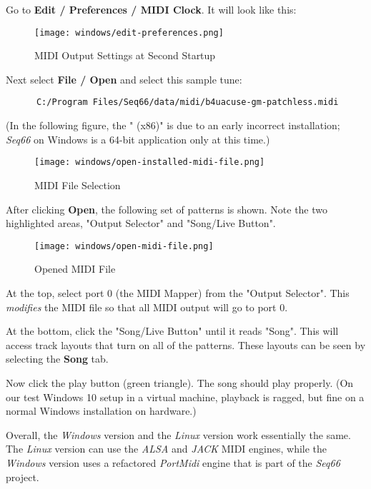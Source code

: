    Go to \textbf{Edit / Preferences / MIDI Clock}.
   It will look like this:

\begin{figure}[H]
   \centering 
   \texttt{[image: windows/edit-preferences.png]}
   \caption{MIDI Output Settings at Second Startup}
   \label{fig:windows_output_settings_second_startup}
\end{figure}

   Next select \textbf{File / Open} and select this sample tune:

   \begin{verbatim}
      C:/Program Files/Seq66/data/midi/b4uacuse-gm-patchless.midi
   \end{verbatim}

   (In the following figure, the " (x86)" is due to an early incorrect
   installation; \textsl{Seq66} on Windows is a 64-bit application only
   at this time.)

\begin{figure}[H]
   \centering 
   \texttt{[image: windows/open-installed-midi-file.png]}
   \caption{MIDI File Selection}
   \label{fig:windows_open_installed_midi_file}
\end{figure}

   After clicking \textbf{Open}, the following set of patterns is shown.
   Note the two highlighted areas, "Output Selector" and "Song/Live Button".

\begin{figure}[H]
   \centering 
   \texttt{[image: windows/open-midi-file.png]}
   \caption{Opened MIDI File}
   \label{fig:windows_open_midi_file}
\end{figure}

   At the top, select port 0 (the MIDI Mapper) from the "Output Selector".
   This \textsl{modifies} the MIDI file so that all MIDI
   output will go to port 0.

   At the bottom, click the "Song/Live Button" until it reads "Song".
   This will access track layouts that turn on all of the patterns.
   These layouts can be seen by selecting the \textbf{Song} tab.

   Now click the play button (green triangle).
   The song should play properly.
   (On our test Windows 10 setup in a virtual machine, playback is ragged,
   but fine on a normal Windows installation on hardware.)

   Overall, the \textsl{Windows} version and the \textsl{Linux} version
   work essentially the same. The \textsl{Linux} version can use the
   \textsl{ALSA} and \textsl{JACK} MIDI engines, while the \textsl{Windows}
   version uses a refactored \textsl{PortMidi} engine that is part of the
   \textsl{Seq66} project.


